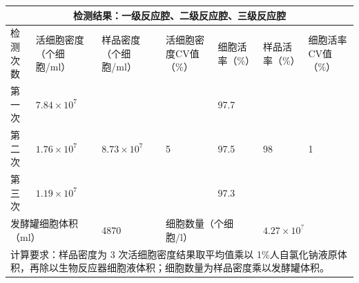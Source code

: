 \documentclass[UTF8,10pt,a4paper,fontset=fandol]{ctexart}
\newcommand{\fieldvalue}[1]{#1}
\newcommand{\handwritten}[1]{#1}
\begin{document}
\begin{center}
\small
\begin{tabular}{|p{1.15cm}|p{2.15cm}|p{2.05cm}|p{1.55cm}|p{1.45cm}|p{1.45cm}|p{1.55cm}|}
\hline
\multicolumn{7}{|c|}{检测结果：一级反应腔、二级反应腔、三级反应腔}\\
\hline
检测次数
& 活细胞密度（个细胞/ml）
& 样品密度（个细胞/ml）
& 活细胞密度CV值（\%）
& 细胞活率（\%）
& 样品活率（\%）
& 细胞活率CV值（\%）\\
\hline
第一次
&
\fieldvalue{\handwritten{$7.84\times10^{7}$}}
&
&
&
\fieldvalue{\handwritten{97.7}}
&
&
\\
\hline
第二次
&
\fieldvalue{\handwritten{$1.76\times10^{7}$}}
&
\fieldvalue{\handwritten{$8.73\times10^{7}$}}
&
\fieldvalue{\handwritten{5}}
&
\fieldvalue{\handwritten{97.5}}
&
\fieldvalue{\handwritten{98}}
&
\fieldvalue{\handwritten{1}}
\\
\hline
第三次
&
\fieldvalue{\handwritten{$1.19\times10^{7}$}}
&
&
&
\fieldvalue{\handwritten{97.3}}
&
&
\\
\hline
\multicolumn{2}{|l|}{发酵罐细胞体积（ml）}
&
\fieldvalue{\handwritten{4870}}
&
\multicolumn{2}{l|}{细胞数量（个细胞/l）}
&
\multicolumn{2}{l|}{
\fieldvalue{\handwritten{$4.27\times10^{?}$}}
}\\
\hline
\multicolumn{7}{|p{14.5cm}|}{
计算要求：样品密度为 3 次活细胞密度结果取平均值乘以 1\%人自氯化钠液原体积，再除以生物反应器细胞液体积；细胞数量为样品密度乘以发酵罐体积。
}\\
\hline

\end{tabular}
\end{center}
\end{document}
